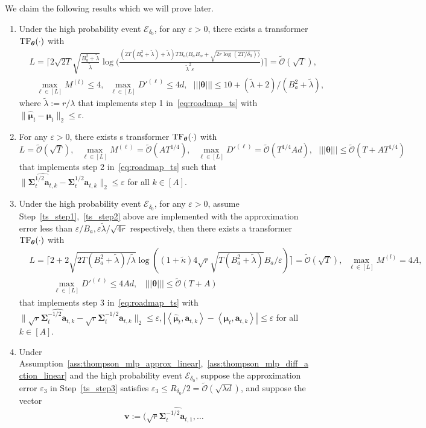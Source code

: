 \documentclass[10pt]{article}
\newcommand{\eps}{\varepsilon}
\newcommand{\<}{\left\langle}
\renewcommand{\>}{\right\rangle}
\newcommand{\lth}{{(\ell)}}
\newcommand{\TF}{{\rm TF}}
\newcommand{\nrmp}[1]{{\left|\!\left|\!\left|{#1}\right|\!\right|\!\right|}}
\newcommand{\Tpsmean}{{{\mathbf\mu}}}
\newcommand{\Tpscov}{{{\mathbf\Sigma}}}
\newcommand{\Tpspar}{{\lambda}}
\newcommand{\Tpsparn}{{r}}
\newcommand{\hpevent}{{\mathcal E}}
\newcommand{\padecond}{{\tilde \kappa}}
\newcommand{\bigvec}{{\mathbf{v}}}
\newcommand{\tcO}{{\tilde{\mathcal O}}}
\newcommand{\hidden}{{D'}}
\def\btheta{{\boldsymbol \theta}}
\def\ba{{\mathbf a}}
\begin{document}
We claim the following results which we will prove later.
\begin{enumerate}[label=Step \arabic*,ref= \arabic*]
    \item\label{ts_step1} Under the high probability event $\hpevent_{\delta_0}$, for any $\eps>0$,
    there exists a transformer $\TF_\btheta(\cdot)$ with
\begin{align*}&L=\Big\lceil2\sqrt{2T}\sqrt{\frac{B_a^2+\widetilde\lambda}{\widetilde\lambda}}\log\Big(\frac{(2T(B_a^2+\widetilde\lambda)+\widetilde\lambda)TB_a(B_aB_w+\sqrt{2\Tpsparn\log(2T/{\delta_0}))}}{\widetilde\lambda^2\eps}\Big)\Big\rceil=\tcO(\sqrt{T}),\\
&~~~\max_{\ell\in[L]}M^{(l)}\leq4,~~\max_{\ell\in[L]}\hidden^\lth\leq 4d,~~~\nrmp{\btheta}\leq  10+(\tilde\lambda+2)/(B_a^2+\tilde\lambda), \end{align*}
where $\widetilde\lambda:=\Tpsparn/\Tpspar$
 that implements step 1 in~\eqref{eq:roadmap_ts} with  $\|\widehat\Tpsmean_t-\Tpsmean_t\|_2\leq\eps$.
    \item\label{ts_step2}
    For any $\eps>0$, there exists s transformer $\TF_\btheta(\cdot)$ with     $$L=\tcO(\sqrt{T}),~~~\max_{\ell\in[L]} M^{(\ell)}=\tcO(AT^{1/4}),~~~\max_{\ell\in[L]} \hidden^{(\ell)}=\tcO(T^{1/4}Ad),~~~\nrmp{\btheta}\leq \tcO(T+AT^{1/4}) $$
 that implements step 2 in~\eqref{eq:roadmap_ts} such that $\|\widehat{\Tpscov_t^{1/2}\ba_{t,k}}-{\Tpscov_t^{1/2}\ba_{t,k}}\|_2\leq \eps$ for all $k\in[A]$.
   \item\label{ts_step3}
   Under the high probability event $\hpevent_{\delta_0}$,
   for any $\eps>0$, assume Step~\ref{ts_step1},~\ref{ts_step2} above are implemented with the approximation error less than $\eps/B_a,\eps\tilde\lambda/\sqrt{4\Tpsparn}$ respectively, then there exists a transformer $\TF_\btheta(\cdot)$ with
 \begin{align*}
  &L=\lceil2+2\sqrt{2 T(B_a^2+\tilde\lambda)/\tilde\lambda}\log((1+\padecond)4\sqrt{\Tpsparn}\sqrt{T(B_a^2+\tilde\lambda)}B_a/\eps)\rceil=\tcO(\sqrt{T}),~~\max_{\ell\in[L]}M^{(l)}=4A,\\
  &~~~\qquad\max_{\ell\in[L]} \hidden^\lth\leq 4Ad,~~~~ \nrmp{\btheta}\leq  \tcO(T+A)
  \end{align*}
 that implements step 3 in~\eqref{eq:roadmap_ts} with   $\|\sqrt{\Tpsparn}\widehat{\Tpscov_t^{-1/2}\ba_{t,k}}-\sqrt{\Tpsparn}\Tpscov_t^{-1/2}\ba_{t,k}\|_2 \leq\eps,|\<\widehat\Tpsmean_t,\ba_{t,k}\>-\<\Tpsmean_t,\ba_{t,k}\>|\leq\eps$ for all $k\in[A]$.
  \item\label{ts_step4} Under  Assumption~\ref{ass:thompson_mlp_approx_linear},~\ref{ass:thompson_mlp_diff_action_linear} and the high probability event $\hpevent_{\delta_0}$, suppose the approximation error $\eps_3$ in Step~\ref{ts_step3} satisfies $\eps_3\leq R_{\delta_0}/2=\tcO(\sqrt{\lambda d})$, and  suppose the vector $$\bigvec:=(\sqrt{\Tpsparn}\widehat{\Tpscov_t^{-1/2}\ba_{t,1}},\ldots
$$
\end{enumerate}
\end{document}
